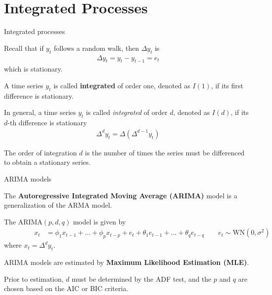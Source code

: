 \documentclass[10pt,aspectratio=169]{beamer}  %
\begin{document}

\section{Integrated Processes}


\begin{frame}{Integrated processes}

    \bigskip
    Recall that if $ y_{t} $ follows a random walk, then $ \Delta y_{t} $ is \begin{align*}
        \Delta y_{t} = y_{t} - y_{t-1} = e_{t}
    \end{align*}
    which is stationary.

    A time series $ y_{t} $ is called \textbf{integrated} of order one, denoted as $ I(1) $, if its first difference is stationary.

    \medskip
    In general, a time series $ y_{t} $ is called \textit{integrated} of order $ d $, denoted as $ I(d) $, if its $ d $-th difference is stationary
    \begin{align*}
        \Delta^{d} y_{t} = \Delta \left( \Delta^{d-1} y_{t} \right)
    \end{align*}

    The order of integration $ d $ is the number of times the series must be differenced to obtain a stationary series.

\end{frame}


\begin{frame}{ARIMA models}

    \bigskip
    The \textbf{Autoregressive Integrated Moving Average (ARIMA)} model is a generalization of the ARMA model.

    \medskip
    The $ \text{ARIMA} (p, d, q) $ model is given by
    \begin{align*}
        \qquad\qquad x_{t} & = \phi_1 x_{t-1} + \ldots + \phi_p x_{t-p} + e_{t} + \theta_1 e_{t-1} + \ldots + \theta_q e_{t-q} \qquad e_{t} \sim \text{WN} \left( 0, \sigma^{2} \right)
    \end{align*}
    where $ x_{t} = \Delta^{d} y_{t} $.

    \medskip
    ARIMA models are estimated by \textbf{Maximum Likelihood Estimation (MLE)}.

    \medskip
    Prior to estimation, $ d $ must be determined by the ADF test, and the $ p $ and $ q $ are chosen based on the AIC or BIC criteria.

\end{frame}
\end{document}
